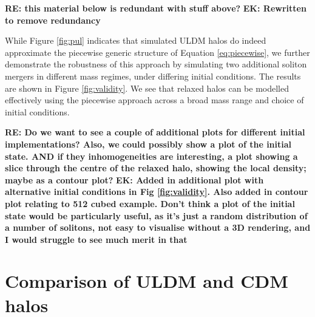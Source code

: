 \documentclass[a4paper,11pt]{article}
\newcommand{\ek}[1]{{{\bf \color{red} EK: #1}}}
\newcommand{\re}[1]{{{\bf \color{green} RE: #1}}}
\begin{document}
\re{this material below  is redundant with stuff above?}\ek{Rewritten to remove redundancy} 

While Figure \ref{fig:pul} indicates that simulated ULDM halos do indeed approximate the piecewise generic structure of Equation \ref{eq:piecewise}, we further demonstrate the robustness of this approach by simulating two additional soliton mergers in different mass regimes, under differing initial conditions. The results are shown in Figure \ref{fig:validity}. We see that relaxed halos can be modelled effectively using the piecewise approach across a broad mass range and choice of initial conditions. 

\re{Do we want to see a couple of additional plots for different initial implementations? Also, we could possibly show a plot of the initial state. AND if they inhomogeneities are interesting, a plot showing a slice through the centre of the relaxed halo, showing the local density; maybe as a contour plot?}
\ek{Added in additional plot with alternative initial conditions in Fig \ref{fig:validity}. Also added in contour plot relating to 512 cubed example. Don't think a plot of the initial state would be particularly useful, as it's just a random distribution of a number of solitons, not easy to visualise without a 3D rendering, and I would struggle to see much merit in that}


\section{Comparison of ULDM and CDM halos}\label{sec:ULDM_v_CDM}
\end{document}
